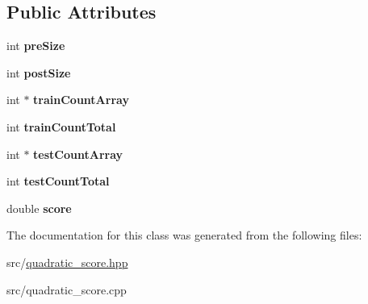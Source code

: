 \subsection*{Public Attributes}
\begin{DoxyCompactItemize}
\item 
\hypertarget{classQuadraticScoreValue_a303298a56187f679d0d543e94497bbf2}{int {\bfseries pre\-Size}}\label{classQuadraticScoreValue_a303298a56187f679d0d543e94497bbf2}

\item 
\hypertarget{classQuadraticScoreValue_aeac7dda509b3deaaef504195e1baf625}{int {\bfseries post\-Size}}\label{classQuadraticScoreValue_aeac7dda509b3deaaef504195e1baf625}

\item 
\hypertarget{classQuadraticScoreValue_aa04e87ca8dde0ce1551a034430af3d8e}{int $\ast$ {\bfseries train\-Count\-Array}}\label{classQuadraticScoreValue_aa04e87ca8dde0ce1551a034430af3d8e}

\item 
\hypertarget{classQuadraticScoreValue_a87d90a4f241d4dca48fadebf573b70f6}{int {\bfseries train\-Count\-Total}}\label{classQuadraticScoreValue_a87d90a4f241d4dca48fadebf573b70f6}

\item 
\hypertarget{classQuadraticScoreValue_af5d93fdea22a3ecc3c6a768afd0c69e7}{int $\ast$ {\bfseries test\-Count\-Array}}\label{classQuadraticScoreValue_af5d93fdea22a3ecc3c6a768afd0c69e7}

\item 
\hypertarget{classQuadraticScoreValue_adf461ad188cd69544b1068df13f44467}{int {\bfseries test\-Count\-Total}}\label{classQuadraticScoreValue_adf461ad188cd69544b1068df13f44467}

\item 
\hypertarget{classQuadraticScoreValue_a04b8ae358271a93222e4ec154113a0ed}{double {\bfseries score}}\label{classQuadraticScoreValue_a04b8ae358271a93222e4ec154113a0ed}

\end{DoxyCompactItemize}


The documentation for this class was generated from the following files\-:\begin{DoxyCompactItemize}
\item 
src/\hyperlink{quadratic__score_8hpp}{quadratic\-\_\-score.\-hpp}\item 
src/quadratic\-\_\-score.\-cpp\end{DoxyCompactItemize}
